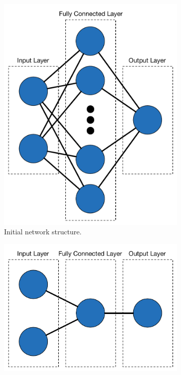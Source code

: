 \begin{figure}[h!]
  \begin{center}
  \begin{subfigure}{.5\textwidth}
    \begin{center}
        \includegraphics[width=.9\linewidth]{images/large_fc_summation.pdf}
        \caption{Initial network structure.}
        \label{fig:large_fc_summation}
      \end{center}
  \end{subfigure}%
    \begin{subfigure}{.5\textwidth}
      \begin{center}
        \includegraphics[width=.9\linewidth]{images/optimum_fc_summation.pdf}

\end{center}
\end{subfigure}
\end{center}
\end{figure}
